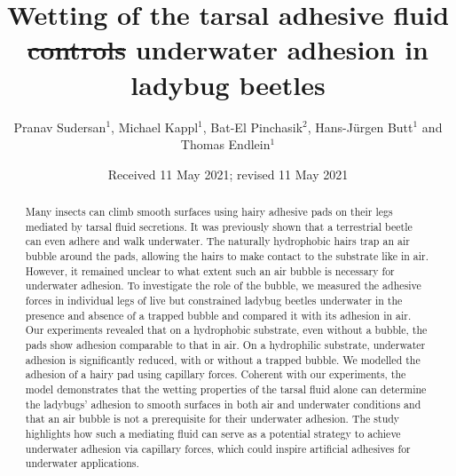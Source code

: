 \documentclass[vruler,JEB]{COB}%
\providecommand{\DIFadd}[1]{{\protect\color{blue}\uwave{#1}}} %
\providecommand{\DIFdel}[1]{{\protect\color{red}\sout{#1}}}                      %
\providecommand{\DIFaddbegin}{} %
\providecommand{\DIFaddend}{} %
\providecommand{\DIFdelbegin}{} %
\providecommand{\DIFdelend}{} %
\begin{document}

\title{Wetting of the tarsal adhesive fluid \DIFdelbegin \DIFdel{controls }\DIFdelend \DIFaddbegin \DIFadd{determines }\DIFaddend underwater adhesion in ladybug beetles}

\author{Pranav Sudersan$^{1}$, Michael Kappl$^{1}$, Bat-El Pinchasik$^{2}$, Hans-J\"{u}rgen Butt$^{1}$ and Thomas Endlein$^{1}$}

\address{
}

\DIFdelbegin %
\DIFdelend \DIFaddbegin {}
\DIFaddend 

\date{Received 11 May 2021; revised 11 May 2021} %

\maketitle

\begin{abstract}
Many insects can climb smooth surfaces using hairy adhesive pads on their legs mediated by tarsal fluid secretions. It was previously shown that a terrestrial beetle can even adhere and walk underwater. The naturally hydrophobic hairs trap an air bubble around the pads, allowing the hairs to make contact to the substrate like in air. However, it remained unclear to what extent such an air bubble is necessary for underwater adhesion. To investigate the role of the bubble, we measured the adhesive forces in individual legs of live but constrained ladybug beetles underwater in the presence and absence of a trapped bubble and compared it with its adhesion in air. Our experiments revealed that on a hydrophobic substrate, even without a bubble, the pads show adhesion comparable to that in air. On a hydrophilic substrate, underwater adhesion is significantly reduced, with or without a trapped bubble. We modelled the adhesion of a hairy pad using capillary forces. Coherent with our experiments, the model demonstrates that the wetting properties of the tarsal fluid alone can determine the ladybugs'  adhesion to smooth surfaces in both air and underwater conditions and that an air bubble is not a prerequisite for their underwater adhesion. The study highlights how such a mediating fluid can serve as a potential strategy to achieve underwater adhesion via capillary forces, which could inspire artificial adhesives for underwater applications.
\end{abstract}
\end{document}
